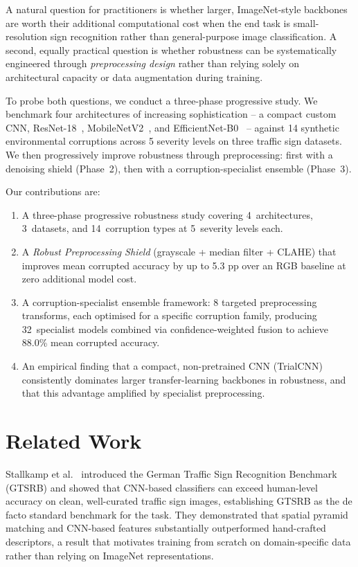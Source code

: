\documentclass[conference]{IEEEtran}
\begin{document}
A natural question for practitioners is whether larger, ImageNet-style backbones are worth their additional computational cost when the end task is small-resolution sign recognition rather than general-purpose image classification. A second, equally practical question is whether robustness can be systematically engineered through \emph{preprocessing design} rather than relying solely on architectural capacity or data augmentation during training.

To probe both questions, we conduct a three-phase progressive study. We benchmark four architectures of increasing sophistication -- a compact custom CNN, ResNet-18~\cite{resnet}, MobileNetV2~\cite{mobilenetv2}, and EfficientNet-B0~\cite{efficientnet} -- against 14 synthetic environmental corruptions across 5 severity levels on three traffic sign datasets. We then progressively improve robustness through preprocessing: first with a denoising shield (Phase~2), then with a corruption-specialist ensemble (Phase~3).

Our contributions are:
\begin{enumerate}
\item A three-phase progressive robustness study covering 4~architectures, 3~datasets, and 14~corruption types at 5~severity levels each.
\item A \emph{Robust Preprocessing Shield} (grayscale + median filter + CLAHE) that improves mean corrupted accuracy by up to 5.3 pp over an RGB baseline at zero additional model cost.
\item A corruption-specialist ensemble framework: 8 targeted preprocessing transforms, each optimised for a specific corruption family, producing 32~specialist models combined via confidence-weighted fusion to achieve 88.0\% mean corrupted accuracy.
\item An empirical finding that a compact, non-pretrained CNN (TrialCNN) consistently dominates larger transfer-learning backbones in robustness, and that this advantage amplified by specialist preprocessing.
\end{enumerate}

\section{Related Work}
Stallkamp et al.~\cite{gtsrb} introduced the German Traffic Sign Recognition Benchmark (GTSRB) and showed that CNN-based classifiers can exceed human-level accuracy on clean, well-curated traffic sign images, establishing GTSRB as the de facto standard benchmark for the task. They demonstrated that spatial pyramid matching and CNN-based features substantially outperformed hand-crafted descriptors, a result that motivates training from scratch on domain-specific data rather than relying on ImageNet representations.
\end{document}
